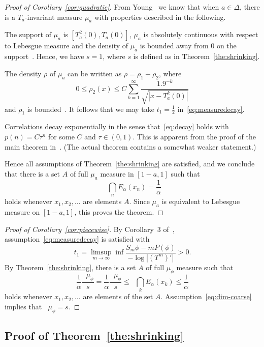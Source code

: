 \documentclass[10pt]{amsart}
\theoremstyle{definition}\newtheorem{defi}[theo]{Definition}\newtheorem{rema}[theo]{Remark}\newtheorem{exam}[theo]{Example}\newtheorem{exem}[theo]{Example}\newtheorem{nota}[theo]{Notation}
\DeclareMathOperator{\dimh}{dim_H}
\DeclareMathOperator{\udimh}{\overline{dim}_H}
\begin{document}
\begin{proof}[Proof of Corollary~\ref{cor:quadratic}]
From Young~\cite{young} we know that when $a \in \Delta$, there is a $T_a$-invariant measure $\mu_a$ with properties described in the following.

The support of $\mu_a$ is $[T_a^2 (0), T_a (0)]$, $\mu_a$ is absolutely continuous with respect to Lebesgue measure and the density of $\mu_a$ is bounded away from $0$ on the support~\cite[Theorem~2]{young}. Hence, we have $s=1$, where $s$ is defined as in Theorem~\ref{the:shrinking}.

The density $\rho$ of $\mu_a$ can be written as $\rho = \rho_1 +
\rho_2$, where
\[
0 \leq \rho_2 (x) \leq C \sum_{k=1}^\infty \frac{1.9^{-k}}{\sqrt{|x - T_a^k (0)|}}
\]
and $\rho_1$ is bounded~\cite[Theorem~1]{young}. It follows that we may take $t_1 = \frac{1}{2}$ in~\eqref{eq:measuredecay}.

Correlations decay exponentially in the sense that~\eqref{eq:decay} holds with $p(n) = C \tau^n$ for some $C$ and $\tau \in (0,1)$. This is apparent from the proof of the main theorem in~\cite{young}. (The actual theorem contains a somewhat weaker statement.)

Hence all assumptions of Theorem~\ref{the:shrinking} are satisfied, and we conclude that there is a set $A$ of full $\mu_a$ measure in $[1-a,1]$ such that
\[
\dimh \bigcap_n E_\alpha (x_n) = \frac{1}{\alpha}
\]
holds whenever $x_1, x_2, \ldots$ are elements $A$. Since $\mu_a$ is equivalent to Lebesgue measure on $[1-a,1]$, this proves the theorem.
\end{proof}

\begin{proof}[Proof of Corollary~\ref{cor:piecewise}]
By Corollary~3 of~\cite{perssonrams}, assumption~\eqref{eq:measuredecay} is satisfied with
\[
t_1 = \limsup_{m\to \infty} \inf \frac{S_m \phi - m P(\phi)}{- \log |(T^m)'|} > 0.
\]
By Theorem~\ref{the:shrinking}, there is a set $A$ of full $\mu_\phi$ measure such that
\[
\frac{1}{\alpha} \frac{\dimh \mu_\phi}{s} = \frac{1}{\alpha}
\frac{\udimh \mu_\phi}{s} \leq \dimh \bigcap_k E_\alpha (x_k) \leq
\frac{1}{\alpha}
\]
holds whenever $x_1, x_2, \ldots$ are elements of the set $A$. Assumption~\eqref{eq:dim-coarse} implies that $\dimh \mu_\phi = s$.
\end{proof}


\subsection{Proof of Theorem~\ref{the:shrinking}}
\end{document}
